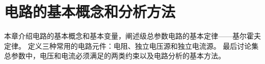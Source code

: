 \chapter{电路的基本概念和分析方法}

本章介绍电路的基本概念和基本变量，阐述级总参数电路的基本定律——基尔霍夫定律。
定义三种常用的电路元件：电阻、独立电压源和独立电流源。
最后讨论集总参数中，电压和电流必须满足的两类约束以及电路分析的基本方法。



